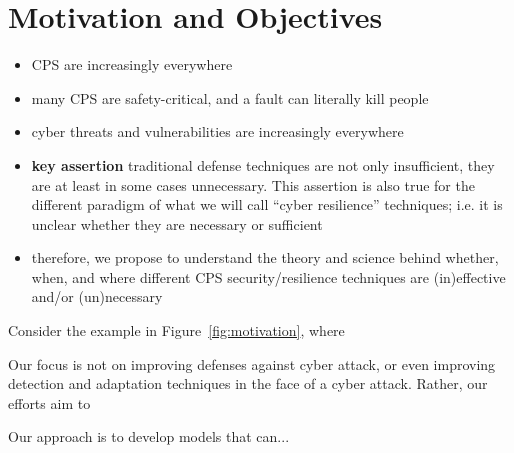 \section{Motivation and Objectives}

\begin{itemize}
    \item CPS are increasingly everywhere
    \item many CPS are safety-critical, and a fault can literally kill people
    \item cyber threats and vulnerabilities are increasingly everywhere
    \item {\bf key assertion} traditional defense techniques are not only insufficient, they are at least in some cases unnecessary. This assertion is also true for the different paradigm of what we will call ``cyber resilience'' techniques; i.e. it is unclear whether they are necessary or sufficient
    \item therefore, we propose to understand the theory and science behind whether, when, and where different CPS security/resilience techniques are (in)effective and/or (un)necessary
\end{itemize}


Consider the example in Figure~\ref{fig:motivation}, where

\begin{figure}
\end{figure}

Our focus is not on improving defenses against cyber attack, or even improving detection and adaptation techniques in the face of a cyber attack. Rather, our efforts aim to


Our approach is to develop models that can...
\begin{figure}
\end{figure}